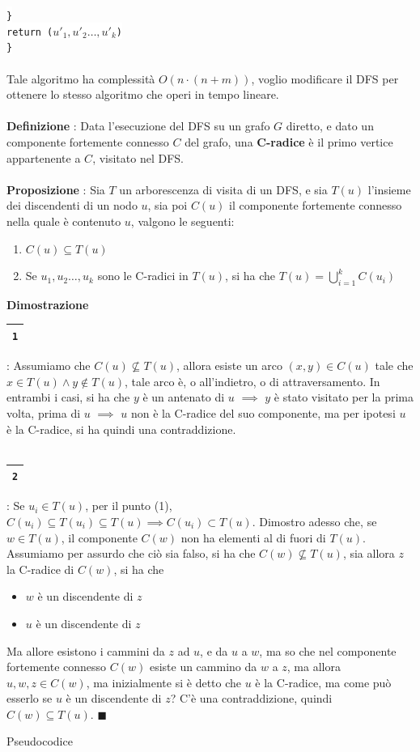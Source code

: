 \documentclass[12pt, letterpaper]{article}
\newcommand{\codee}[1]{\colorbox{white}{\texttt{#1}}}
\newcommand{\acc}{\\\hphantom{}\\}
\newcommand{\boxedMath}[1]{\begin{tabular}{|c|}\hline \texttt{#1} \\ \hline\end{tabular} :}
\begin{document}
\hphantom{ident}\codee{\}}\\
\hphantom{ident}\codee{return ($u'_1,u'_2\dots,u'_k$)}\\
\codee{\}}\acc
Tale algoritmo ha complessità $O(n\cdot(n+m))$, voglio modificare il DFS per ottenere lo stesso algoritmo che operi in 
tempo lineare.\acc 
\textbf{Definizione} : Data l'esecuzione del DFS su un grafo $G$ diretto, e dato un componente fortemente 
connesso $C$ del grafo, una \textbf{C-radice} è il primo vertice appartenente a $C$, visitato nel DFS.\acc 
\textbf{Proposizione} : Sia $T$ un arborescenza di visita di un DFS, e sia $T(u)$ l'insieme dei discendenti di un nodo 
$u$, sia poi $C(u)$ il componente fortemente connesso nella quale è contenuto $u$, valgono le seguenti:\begin{enumerate}
    \item $C(u)\subseteq T(u)$
    \item Se $u_1,u_2\dots,u_k$ sono le C-radici in $T(u)$, si ha che $\displaystyle T(u)=\bigcup_{i=1}^k C(u_i)$
\end{enumerate}
\textbf{Dimostrazione} \boxedMath{1} Assumiamo che $C(u)\nsubseteq  T(u)$, allora esiste un arco $(x,y)\in C(u)$ tale 
che $x\in T(u)\land y\notin T(u)$, tale arco è, o all'indietro, o di attraversamento. In entrambi i casi, si ha che 
$y$ è un antenato di $u$ $\implies$ $y$ è stato visitato per la prima volta, prima di $u$ $\implies$ $u$ non è la 
C-radice del suo componente, ma per ipotesi $u$ è la C-radice, si ha quindi una contraddizione.\acc
\boxedMath{2} Se $u_i\in T(u)$, per il punto (1), $C(u_i)\subseteq T(u_i) \subseteq T(u)\implies C(u_i)\subset T(u)$. Dimostro 
adesso che, 
se $w\in T(u)$, il componente $C(w)$ non ha elementi al di fuori di $T(u)$. Assumiamo per assurdo che ciò sia falso, si ha 
che $C(w)\nsubseteq T(u)$, sia allora $z$ la C-radice di $C(w)$, si ha che  \begin{itemize}
    \item $w$ è un discendente di $z$
    \item $u$ è un discendente di $z$
\end{itemize}
Ma allore esistono i cammini da $z$ ad $u$, e da $u$ a $w$, ma so che nel componente fortemente connesso $C(w)$ esiste 
un cammino da $w$ a $z$, ma allora $u,w,z\in C(w)$, ma inizialmente si è detto che $u$ è la C-radice, ma come può esserlo se 
$u$ è un discendente di $z$? C'è una contraddizione, quindi $C(w)\subseteq T(u)$. $\blacksquare$
\begin{center}
    Pseudocodice
\end{center}
\end{document}
